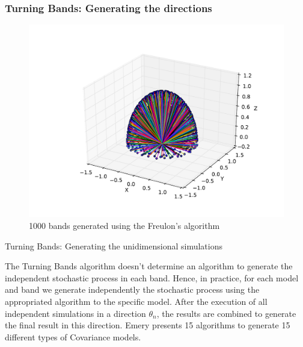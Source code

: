 \begin{frame}
\frametitle{Turning Bands: Generating the directions}
\begin{figure}
\begin{center}
\includegraphics[height=0.7\textheight]{figs/freulon_algo_1000_bands.pdf}
\end{center}
\caption{1000 bands generated using the Freulon's algorithm}
\label{fig:freulon_algo_1000_bands}
\end{figure}
\end{frame}


\begin{frame}{Turning Bands: Generating the unidimensional simulations}
 
 The Turning Bands algorithm doesn't determine an algorithm to generate the independent stochastic process in each band. 
 Hence, in practice, for each model and band we generate independently the stochastic process using the appropriated 
 algorithm to the specific model. After the execution of all independent simulations in a direction $\theta_n$, 
 the results are combined to generate the final result in this direction. Emery \cite{emery2006tbsim} presents 15 algorithms
 to generate 15 different types of Covariance models.
 
\end{frame}

